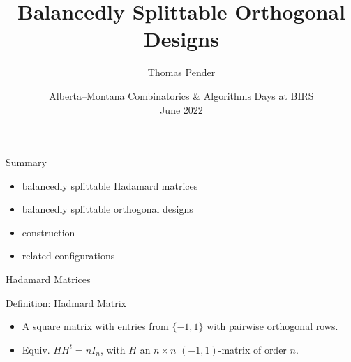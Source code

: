 \documentclass{beamer}
\title[Splittable ODs]{Balancedly Splittable Orthogonal Designs}
\author[T. Pender]{Thomas Pender}
\institute[U of L]{Department of Mathematics and Computer Science\\University of
Lethbridge}
\date[BIRS June 2022]{Alberta--Montana Combinatorics \& Algorithms Days at BIRS\\June 2022}
\begin{document}

\begin{frame}

  \titlepage
\end{frame}

\begin{frame}{Summary}

  \begin{itemize}
    \item balancedly splittable Hadamard matrices
    \item balancedly splittable orthogonal designs
    \item construction
    \item related configurations
  \end{itemize}
  
\end{frame}


\begin{frame}{Hadamard Matrices}

  \begin{block}{Definition: Hadmard Matrix}
    \begin{itemize}
      \item A square matrix with entries from $\{-1,1\}$ with pairwise
        orthogonal rows.
      \item Equiv. $HH^t = nI_n$, with $H$ an $n \times n$ $(-1,1)$-matrix of
        order $n$.
    \end{itemize}
  \end{block}

\end{frame}
\end{document}
